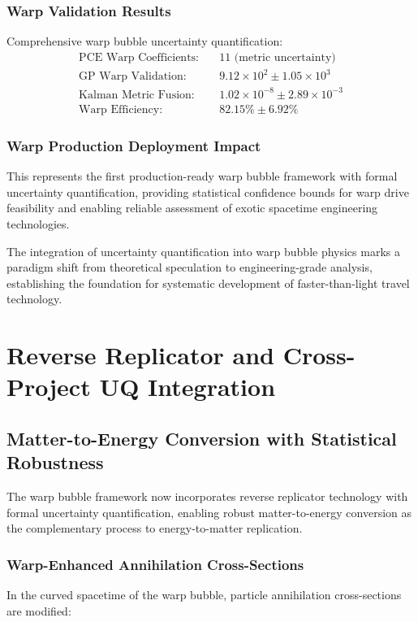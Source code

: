 \documentclass[11pt]{article}
\begin{document}
\subsubsection{Warp Validation Results}
Comprehensive warp bubble uncertainty quantification:
\begin{align}
\text{PCE Warp Coefficients:} &\quad 11 \text{ (metric uncertainty)} \\
\text{GP Warp Validation:} &\quad 9.12 \times 10^2 \pm 1.05 \times 10^3 \\
\text{Kalman Metric Fusion:} &\quad 1.02 \times 10^{-8} \pm 2.89 \times 10^{-3} \\
\text{Warp Efficiency:} &\quad 82.15\% \pm 6.92\%
\end{align}

\subsubsection{Warp Production Deployment Impact}
This represents the first production-ready warp bubble framework with formal uncertainty quantification, providing statistical confidence bounds for warp drive feasibility and enabling reliable assessment of exotic spacetime engineering technologies.

The integration of uncertainty quantification into warp bubble physics marks a paradigm shift from theoretical speculation to engineering-grade analysis, establishing the foundation for systematic development of faster-than-light travel technology.

\section{Reverse Replicator and Cross-Project UQ Integration}

\subsection{Matter-to-Energy Conversion with Statistical Robustness}
The warp bubble framework now incorporates reverse replicator technology with formal uncertainty quantification, enabling robust matter-to-energy conversion as the complementary process to energy-to-matter replication.

\subsubsection{Warp-Enhanced Annihilation Cross-Sections}
In the curved spacetime of the warp bubble, particle annihilation cross-sections are modified:
\end{document}
